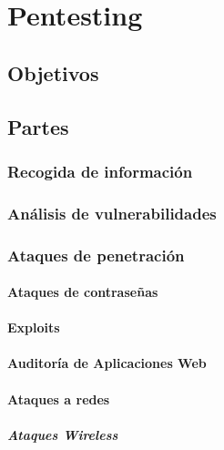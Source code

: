 \chapter{Pentesting}

\section{Objetivos}

\section{Partes}

\subsection{Recogida de información}

\subsection{Análisis de vulnerabilidades}

\subsection{Ataques de penetración}

\subsubsection{Ataques de contraseñas}

\subsubsection{Exploits}

\subsubsection{Auditoría de Aplicaciones Web}

\subsubsection{Ataques a redes}

\paragraph{Ataques Wireless}